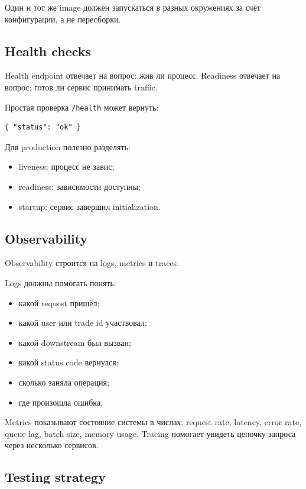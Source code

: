 \documentclass[12pt,a4paper]{article}
\begin{document}
Один и тот же image должен запускаться в разных окружениях за счёт конфигурации,
а не пересборки.

\subsection{Health checks}

Health endpoint отвечает на вопрос: жив ли процесс. Readiness отвечает на вопрос:
готов ли сервис принимать traffic.

Простая проверка \texttt{/health} может вернуть:
\begin{verbatim}
{ "status": "ok" }
\end{verbatim}

Для production полезно разделять:
\begin{itemize}
    \item liveness: процесс не завис;
    \item readiness: зависимости доступны;
    \item startup: сервис завершил initialization.
\end{itemize}

\subsection{Observability}

Observability строится на logs, metrics и traces.

Logs должны помогать понять:
\begin{itemize}
    \item какой request пришёл;
    \item какой user или trade id участвовал;
    \item какой downstream был вызван;
    \item какой status code вернулся;
    \item сколько заняла операция;
    \item где произошла ошибка.
\end{itemize}

Metrics показывают состояние системы в числах: request rate, latency, error rate,
queue lag, batch size, memory usage. Tracing помогает увидеть цепочку запроса
через несколько сервисов.

\subsection{Testing strategy}
\end{document}

